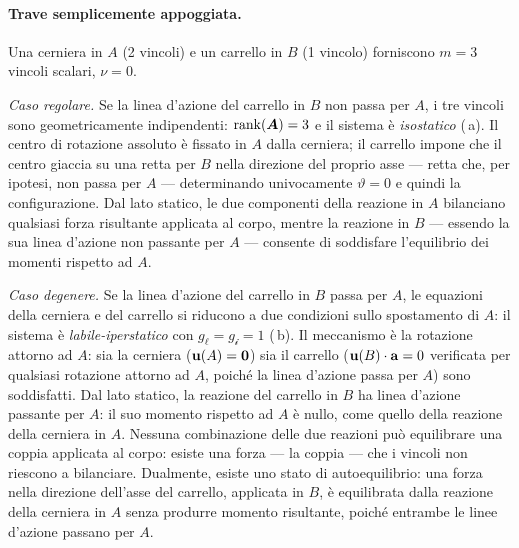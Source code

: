 


\paragraph{Trave semplicemente appoggiata.}
Una cerniera in $A$ (2 vincoli) e un carrello in $B$ (1 vincolo)
forniscono $m = 3$ vincoli scalari, $\nu = 0$.

\smallskip
\noindent\textit{Caso regolare.}
Se la linea d'azione del carrello in $B$ non passa per $A$,
i tre vincoli sono geometricamente indipendenti:
$\operatorname{rank}(\bm{A}) = 3$ e il sistema è \textit{isostatico}
(\,a).
Il centro di rotazione assoluto è fissato in $A$ dalla
cerniera; il carrello impone che il centro giaccia su una
retta per $B$ nella direzione del proprio asse --- retta
che, per ipotesi, non passa per $A$ --- determinando
univocamente $\vartheta = 0$ e quindi la configurazione.
Dal lato statico, le due componenti della reazione
in $A$ bilanciano qualsiasi forza risultante applicata
al corpo, mentre la reazione in $B$ --- essendo la sua
linea d'azione non passante per $A$ --- consente di
soddisfare l'equilibrio dei momenti rispetto ad $A$.

\smallskip
\noindent\textit{Caso degenere.}
Se la linea d'azione del carrello in $B$ passa per $A$,
le equazioni della cerniera e del carrello si riducono
a due condizioni sullo spostamento di $A$: il sistema è
\textit{labile-iperstatico} con $g_\ell = g_{\mathscr{i}} = 1$
(\,b).
Il meccanismo è la rotazione attorno ad $A$: sia la
cerniera ($\mathbf{u}(A) = \mathbf{0}$) sia il carrello
($\mathbf{u}(B) \cdot \mathbf{a} = 0$ verificata per qualsiasi rotazione
attorno ad $A$, poiché la linea d'azione passa per $A$)
sono soddisfatti. Dal lato statico, la reazione del carrello in $B$
ha linea d'azione passante per $A$: il suo momento
rispetto ad $A$ è nullo, come quello della reazione
della cerniera in $A$. Nessuna combinazione delle
due reazioni può equilibrare una coppia applicata
al corpo: esiste una forza --- la coppia --- che
i vincoli non riescono a bilanciare. Dualmente,
esiste uno stato di autoequilibrio: una forza nella
direzione dell'asse del carrello, applicata in $B$,
è equilibrata dalla reazione della cerniera in $A$
senza produrre momento risultante, poiché entrambe
le linee d'azione passano per $A$.







